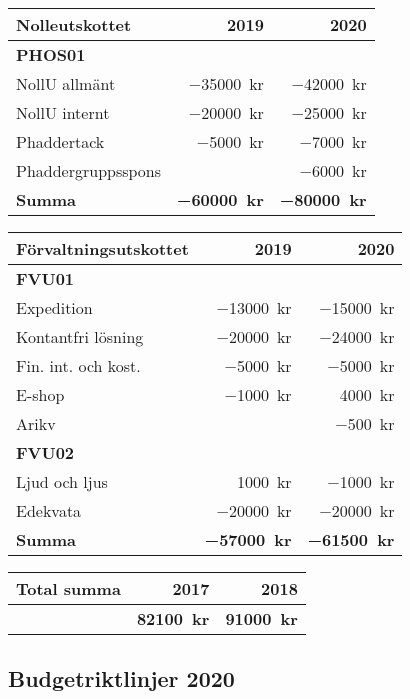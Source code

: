 \documentclass[../_main/handlingar.tex]{subfiles}
\begin{document}
\begin{tabularx}{10cm}{X r r}
    \textbf{\large Nolleutskottet} & \textbf{2019} & \textbf{2020} \\
    \hline
    \textbf{PHOS01} \\
    NollU allmänt & \SI{-35000}{kr} & \SI{-42000}{kr} \\
    NollU internt & \SI{-20000}{kr} & \SI{-25000}{kr} \\
    Phaddertack & \SI{-5000}{kr} & \SI{-7000}{kr} \\
    Phaddergruppsspons & & \SI{-6000}{kr} \\
    \hline
    \textbf{Summa} & \textbf{\SI{-60000}{kr}} & \textbf{\SI{-80000}{kr}} \\
\end{tabularx}

\begin{tabularx}{9cm}{X r r}
    \textbf{\large Förvaltningsutskottet} & \textbf{2019} & \textbf{2020} \\
    \hline
    \textbf{FVU01} \\
    Expedition & \SI{-13000}{kr} & \SI{-15000}{kr} \\
    Kontantfri lösning & \SI{-20000}{kr} & \SI{-24000}{kr} \\
    Fin. int. och kost. & \SI{-5000}{kr} & \SI{-5000}{kr} \\
    E-shop & \SI{-1000}{kr} & \SI{4000}{kr} \\
    Arikv & & \SI{-500}{kr} \\
    \textbf{FVU02} \\
    Ljud och ljus & \SI{1000}{kr} & \SI{-1000}{kr} \\
    Edekvata & \SI{-20000}{kr} & \SI{-20000}{kr} \\
    \hline
    \textbf{Summa} & \textbf{\SI{-57000}{kr}} & \textbf{\SI{-61500}{kr}} \\
\end{tabularx}

\begin{tabularx}{9cm}{X r r}
    \textbf{\large Total summa} & \textbf{2017} & \textbf{2018} \\
    \hline
     & \textbf{\SI{82100}{kr}} & \textbf{\SI{91000}{kr}} \\
\end{tabularx}


\newpage
\subsection*{Budgetriktlinjer 2020}
\end{document}
